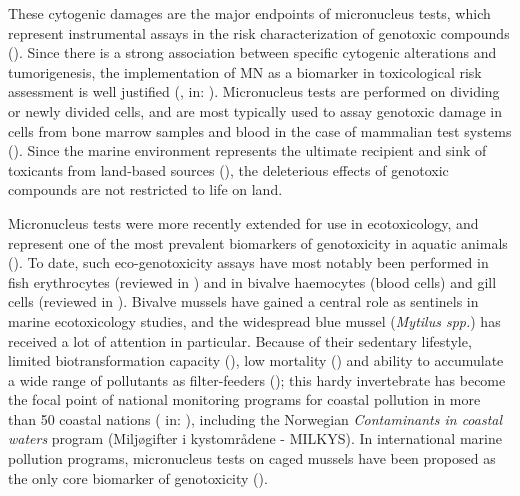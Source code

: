 These cytogenic damages are the major endpoints of micronucleus tests, which represent instrumental assays in the risk characterization of genotoxic compounds (\cite{UNEP2006, ICES2012, OECD474, OECD487, USEPA1998}). Since there is a strong association between specific cytogenic alterations and tumorigenesis, the implementation of MN as a biomarker in toxicological risk assessment is well justified (\cite{Zhang2015}, \cite{Mitelman1983} in: \cite{Tucker1996}). Micronucleus tests are performed on dividing or newly divided cells, and are most typically used to assay genotoxic damage in cells from bone marrow samples and blood in the case of mammalian test systems (\cite{Heddle1983, Warheit2018b}). Since the marine environment represents the ultimate recipient and sink of toxicants from land-based sources (\cite{ICES2012}), the deleterious effects of genotoxic compounds are not restricted to life on land.

Micronucleus tests were more recently extended for use in ecotoxicology, and represent one of the most prevalent biomarkers of genotoxicity in aquatic animals (\cite{Bolognesi2011}). To date, such eco-genotoxicity assays have most notably been performed in fish erythrocytes (reviewed in \cite{Agostini2021}) and in bivalve haemocytes (blood cells) and gill cells (reviewed in \cite{Bolognesi2014}). Bivalve mussels have gained a central role as sentinels in marine ecotoxicology studies, and the widespread blue mussel (\emph{Mytilus spp.}) has received a lot of attention in particular. Because of their sedentary lifestyle, limited biotransformation capacity (\cite{Beyer2017b}), low mortality (\cite{Ale2019, Costa2009}) and ability to accumulate a wide range of pollutants as filter-feeders (\cite{Viarengo1991}); this hardy invertebrate has become the focal point of national monitoring programs for coastal pollution in more than 50 coastal nations (\cite{Cantillo1998} in: \cite{Beyer2017b}), including the Norwegian \emph{Contaminants in coastal waters} program (Miljøgifter i kystområdene - MILKYS). In international marine pollution programs, micronucleus tests on caged mussels have been proposed as the only core biomarker of genotoxicity (\cite{Bolognesi2012}).

